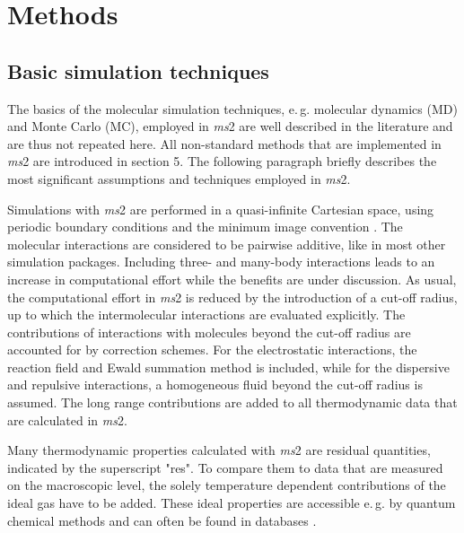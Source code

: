 

\chapter{Methods}
\label{sec:Methods}



\section{Basic simulation techniques}
\label{sec:Basic simulation techniques}


The basics of the molecular simulation techniques, e.\,g. molecular dynamics (MD) and Monte Carlo (MC), employed in \textit{ms}2 are well described in the literature \parencite{Allen, Frenkel, Rappaport} and are thus not repeated here. All non-standard methods that are implemented in \textit{ms}2 are introduced in section 5. The following paragraph briefly describes the most significant assumptions and techniques employed in \textit{ms}2.

Simulations with \textit{ms}2 are performed in a quasi-infinite Cartesian space, using periodic boundary conditions \parencite{born} and the minimum image convention \parencite{metropolis}. The molecular interactions are considered to be pairwise additive, like in most other simulation packages. Including three- and many-body interactions leads to an increase in computational effort while the benefits are under discussion. As usual, the computational effort in \textit{ms}2 is reduced by the introduction of a cut-off radius, up to which the intermolecular interactions are evaluated explicitly. The contributions of interactions with molecules beyond the cut-off radius are accounted for by correction schemes. For the electrostatic interactions, the reaction field and Ewald summation method is included, while for the dispersive and repulsive interactions, a homogeneous fluid beyond the cut-off radius is assumed. The long range contributions are added to all thermodynamic data that are calculated in \textit{ms}2.

Many thermodynamic properties calculated with \textit{ms}2 are residual quantities, indicated by the superscript "res". To compare them to data that are measured on the macroscopic level, the solely temperature dependent contributions of the ideal gas have to be added. These ideal properties are accessible e.\,g. by quantum chemical methods and can often be found in databases \parencite{rowley}.


